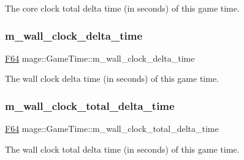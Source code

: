 The core clock total delta time (in seconds) of this game time. \hypertarget{classmage_1_1_game_time_afd4f74b4c930532dbb3b3259cbc068de}{}\label{classmage_1_1_game_time_afd4f74b4c930532dbb3b3259cbc068de} 
\subsubsection{\texorpdfstring{m\+\_\+wall\+\_\+clock\+\_\+delta\+\_\+time}{m\_wall\_clock\_delta\_time}}
{\footnotesize\ttfamily \hyperlink{namespacemage_ad26233bbec640deda836e572c1a23708}{F64} mage\+::\+Game\+Time\+::m\+\_\+wall\+\_\+clock\+\_\+delta\+\_\+time\hspace{0.3cm}{\ttfamily [private]}}

The wall clock delta time (in seconds) of this game time. \hypertarget{classmage_1_1_game_time_a5c2527df90b45a7b4e914c8811fcf52d}{}\label{classmage_1_1_game_time_a5c2527df90b45a7b4e914c8811fcf52d} 
\subsubsection{\texorpdfstring{m\+\_\+wall\+\_\+clock\+\_\+total\+\_\+delta\+\_\+time}{m\_wall\_clock\_total\_delta\_time}}
{\footnotesize\ttfamily \hyperlink{namespacemage_ad26233bbec640deda836e572c1a23708}{F64} mage\+::\+Game\+Time\+::m\+\_\+wall\+\_\+clock\+\_\+total\+\_\+delta\+\_\+time\hspace{0.3cm}{\ttfamily [private]}}

The wall clock total delta time (in seconds) of this game time. 